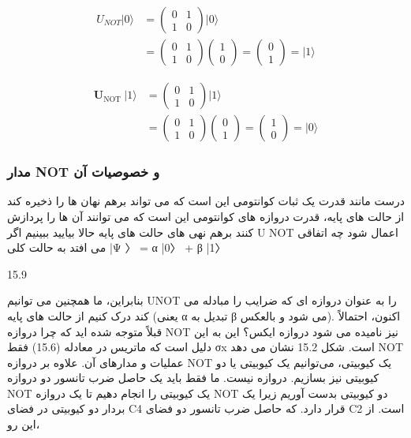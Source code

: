 \documentclass{book}
\begin{document}
$$
\begin{aligned}
	U_{N O T}|0\rangle & =\left(\begin{array}{ll}
		0 & 1 \\
		1 & 0
	\end{array}\right)|0\rangle \\
	& =\left(\begin{array}{ll}
		0 & 1 \\
		1 & 0
	\end{array}\right)\left(\begin{array}{l}
		1 \\
		0
	\end{array}\right)=\left(\begin{array}{l}
		0 \\
		1
	\end{array}\right)=|1\rangle
\end{aligned}
$$

$$
\begin{aligned}
	\boldsymbol{U}_{\text {NOT }}|1\rangle & =\left(\begin{array}{ll}
		0 & 1 \\
		1 & 0
	\end{array}\right)|1\rangle \\
	& =\left(\begin{array}{ll}
		0 & 1 \\
		1 & 0
	\end{array}\right)\left(\begin{array}{l}
		0 \\
		1
	\end{array}\right)=\left(\begin{array}{l}
		1 \\
		0
	\end{array}\right)=|0\rangle
\end{aligned}
$$

\subsubsection{مدار NOT و خصوصیات آن}

درست مانند قدرت یک ثبات کوانتومی این است که می تواند برهم نهان ها را ذخیره کند
از حالت های پایه، قدرت دروازه های کوانتومی این است که می توانند آن ها را پردازش کنند
برهم نهی های حالت های پایه حالا بیایید ببینیم اگر U NOT اعمال شود چه اتفاقی می افتد
به حالت کلی |Ψ 〉 = α |0〉 + β |1〉

15.9

بنابراین، ما همچنین می توانیم UNOT را به عنوان دروازه ای که ضرایب را مبادله می کند درک کنیم
از حالت های پایه (یعنی α تبدیل به β می شود و بالعکس).
اکنون، احتمالاً قبلاً متوجه شده اید که چرا دروازه NOT نیز نامیده می شود
دروازه ایکس؟ این به این دلیل است که ماتریس در معادله (15.6) فقط σx است. شکل 15.2 نشان می دهد
NOT عملیات و مدارهای آن.
علاوه بر دروازه NOT یک کیوبیتی، می‌توانیم یک کیوبیتی یا دو کیوبیتی نیز بسازیم.
دروازه نیست. ما فقط باید یک حاصل ضرب تانسور دو دروازه NOT یک کیوبیتی را انجام دهیم تا یک دروازه NOT دو کیوبیتی بدست آوریم زیرا یک بردار دو کیوبیتی در فضای C4 قرار دارد.
که حاصل ضرب تانسور دو فضای C2 است. از این رو،
\end{document}

